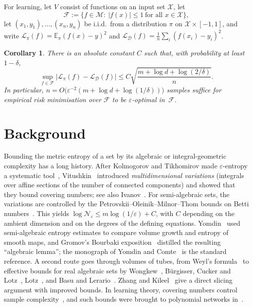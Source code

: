 \documentclass[11pt]{article}
\newtheorem{corollary}[theorem]{Corollary}
\newcommand{\cM}{\mathcal{M}}
\newcommand{\cN}{\mathcal{N}}
\newcommand{\cF}{\mathcal{F}}
\newcommand{\cL}{\mathcal{L}}
\newcommand{\cD}{\mathcal{D}}
\newcommand{\cX}{\mathcal{X}}
\begin{document}
For learning, let $V$ consist of functions on an input set $\cX$, let
\[
  \cF:=\{f\in\cM:\ |f(x)|\le 1\ \text{for all } x\in\cX\},
\]
let $(x_1,y_1),\dots,(x_n,y_n)$ be i.i.d.\ from a distribution $\pi$ on
$\cX\times[-1,1]$, and write $\cL_\pi(f)=\mathbb{E}_\pi(f(x)-y)^2$ and
$\cL_\cD(f)=\frac1n\sum_i(f(x_i)-y_i)^2$.

\begin{corollary}\label{cor:sample}
There is an absolute constant $C$ such that, with probability at least
$1-\delta$,
\[
  \sup_{f\in\cF}\bigl|\cL_\pi(f)-\cL_\cD(f)\bigr|
  \le C\sqrt{\frac{m+\log d+\log(2/\delta)}{n}}.
\]
In particular, $n=O\bigl(\varepsilon^{-2}(m+\log d+\log(1/\delta))\bigr)$
samples suffice for empirical risk minimisation over $\cF$ to be
$\varepsilon$-optimal in~$\cF$.
\end{corollary}

\section{Background}

Bounding the metric entropy of a set by its algebraic or integral-geometric
complexity has a long history. After Kolmogorov and Tikhomirov made
$\varepsilon$-entropy a systematic tool~\cite{KT59}, Vitushkin~\cite{Vi55}
introduced \emph{multidimensional variations} (integrals over affine sections of
the number of connected components) and showed that they bound covering numbers;
see also Ivanov~\cite{Iv75}. For semi-algebraic sets, the variations are
controlled by the Petrovskii--Oleinik--Milnor--Thom bounds on Betti
numbers~\cite{PO49,Mi64,Th65}. This yields
$\log\cN_\varepsilon\le m\log(1/\varepsilon)+C$, with $C$ depending on the
ambient dimension and on the degrees of the defining equations.
Yomdin~\cite{Yo87} used semi-algebraic entropy estimates to compare volume
growth and entropy of smooth maps, and Gromov's Bourbaki
exposition~\cite{Gr87} distilled the resulting ``algebraic lemma''; the
monograph of Yomdin and Comte~\cite{YC04} is the standard reference. A second
route goes through volumes of tubes, from Weyl's formula~\cite{We39} to
effective bounds for real algebraic sets by Wongkew~\cite{Wo93},
B\"urgisser, Cucker and Lotz~\cite{BCL08}, Lotz~\cite{Lo15}, and Basu and
Lerario~\cite{BL23}. Zhang and Kileel~\cite{ZK23} give a direct slicing argument
with improved bounds. In learning theory, covering numbers control sample
complexity~\cite{CS02}, and such bounds were brought to polynomial networks
in~\cite{KTB19,MSMTK25}.
\end{document}
